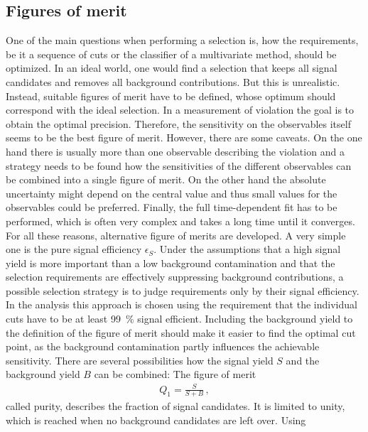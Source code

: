 
\subsection{Figures of merit}
\label{sec:dataanalysis:selection:fom}

One of the main questions when performing a selection is, how the
requirements, be it a sequence of cuts or the classifier of a multivariate
method, should be optimized. In an ideal world, one would find a selection
that keeps all signal candidates and removes all background contributions. But
this is unrealistic. Instead, suitable figures of merit have to be defined,
whose optimum should correspond with the ideal selection.  In a measurement of
\CP violation the goal is to obtain the optimal precision. Therefore, the
sensitivity on the \CP observables itself seems to be the best figure of
merit. However, there are some caveats. On the one hand there is usually more
than one observable describing the \CP violation and a strategy needs to be
found how the sensitivities of the different \CP observables can be combined
into a single figure of merit. On the other hand the absolute uncertainty
might depend on the central value and thus small values for the \CP
observables could be preferred. Finally, the full time-dependent fit has to be
performed, which is often very complex and takes a long time until it
converges. For all these reasons, alternative figure of merits are developed.
A very simple one is the pure signal efficiency $\epsilon_S$. Under the
assumptions that a high signal yield is more important than a low background
contamination and that the selection requirements are effectively suppressing
background contributions, a possible selection strategy is to judge
requirements only by their signal efficiency. In the \BdToJPsiKS analysis this
approach is chosen using the requirement that the individual cuts have to be
at least \SI{99}{\percent} signal efficient. Including the background yield to
the definition of the figure of merit should make it easier to find the
optimal cut point, as the background contamination partly influences the
achievable sensitivity. There are several possibilities how the signal yield
$S$ and the background yield $B$ can be combined: The figure of merit
\begin{align}
	Q_1 = \frac{S}{S + B}\,,
\end{align}
called purity, describes the fraction of signal candidates. It is limited to
unity, which is reached when no background candidates are left over. Using
